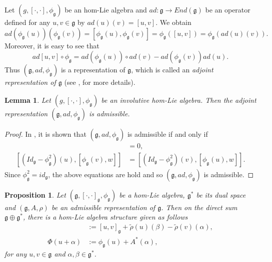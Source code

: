\documentclass[10pt]{amsart}
\numberwithin{equation}{section}
\newtheorem{lemma}[theorem]{Lemma}
\newtheorem{proposition}[theorem]{Proposition}
\begin{document}
Let $(g, [\cdot  , \cdot ], {\phi_\mathfrak{g}})$ be an hom-Lie algebra and $ad : \mathfrak{g}\rightarrow End(\mathfrak{g})$ be an operator defined for any
$u,v\in \mathfrak{g}$ by $ad(u)(v) = [u, v]$.  We obtain
\[
ad(\phi_\mathfrak{g}(u))(\phi_\mathfrak{g}(v))=[\phi_\mathfrak{g}(u), \phi_\mathfrak{g}(v)]=\phi_\mathfrak{g}([u, v])=\phi_\mathfrak{g}(ad(u)(v)).
\]
Moreover, it is easy to see that  
\[
ad{[u,v]}\circ{ \phi_\mathfrak{g}}=ad({ \phi_\mathfrak{g}}(u))\circ ad(v)-ad({ \phi_\mathfrak{g}}(v))ad(u).
\]
Thus $(\mathfrak{g}, ad, { \phi_\mathfrak{g}})$ is a representation of $\mathfrak{g}$, which is called an \textit{adjoint representation of $\mathfrak{g}$} (see \cite{SB}, for more details).
\begin{lemma}
Let $(g, [\cdot  , \cdot ], {\phi_\mathfrak{g}})$ be an involutive hom-Lie algebra. Then the adjoint representation  $(\mathfrak{g}, ad, { \phi_\mathfrak{g}})$ is
admissible.
\end{lemma} 
\begin{proof}
In \cite{SB}, it is shown that $(\mathfrak{g}, ad, { \phi_\mathfrak{g}})$ is admissible if and only if 
\begin{align*}
[(Id_\mathfrak{g}-\phi^2_\mathfrak{g})(u), \phi_\mathfrak{g}(v)]&=0,\\
[(Id_\mathfrak{g}-\phi^2_\mathfrak{g})(u), [\phi_\mathfrak{g}(v), w]]&=[(Id_\mathfrak{g}-\phi^2_\mathfrak{g})(v), [\phi_\mathfrak{g}(u), w]].
\end{align*}
Since $\phi^2_\mathfrak{g}=id_\mathfrak{g}$, the above equations are hold and so $(\mathfrak{g}, ad, { \phi_\mathfrak{g}})$ is
admissible.
\end{proof}
\begin{proposition}
Let $(\mathfrak{g}, [\cdot  ,\cdot ]_{\mathfrak{g}},{ \phi_\mathfrak{g}})$ be a hom-Lie algebra, $\mathfrak{g}^*$ be its dual space and $(\mathfrak{g}, A, \rho)$ be an admissible representation of $\mathfrak{g}$. Then on the direct sum $\mathfrak{g}\oplus\mathfrak{g}^*$, there is a hom-Lie algebra structure given as follows 
\begin{align*}
[u+\alpha,v+\beta]&:=[u,v]_{\mathfrak{g}}+\widetilde{\rho}(u)(\beta)-\widetilde{\rho}(v)(\alpha),\\
\Phi(u+\alpha)&:=\phi_{\mathfrak{g}}(u)+A^*(\alpha),
\end{align*}
for any $u,v\in \mathfrak{g}$ and $\alpha,\beta\in\mathfrak{g}^*$.
\end{proposition}
\end{document}

